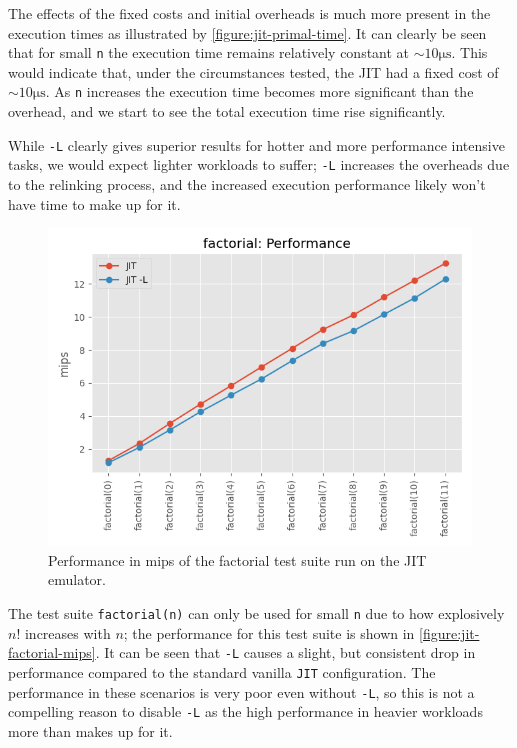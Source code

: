The effects of the fixed costs and initial overheads is much more present in the execution times as illustrated by \autoref{figure:jit-primal-time}. It can clearly be seen that for small \texttt{n} the execution time remains relatively constant at $\sim10\si{\micro\second}$. This would indicate that, under the circumstances tested, the JIT had a fixed cost of $\sim10\si{\micro\second}$. As \texttt{n} increases the execution time becomes more significant than the overhead, and we start to see the total execution time rise significantly.

While \texttt{-L} clearly gives superior results for hotter and more performance intensive tasks, we would expect lighter workloads to suffer; \texttt{-L} increases the overheads due to the relinking process, and the increased execution performance likely won't have time to make up for it.

\begin{figure}[H]
    \centering
    \includegraphics[scale=0.75]{output/graphs/tests/jit/factorial/mips.png}
    \caption{Performance in mips of the factorial test suite run on the JIT emulator.}
    \label{figure:jit-factorial-mips}
\end{figure}

The test suite \texttt{factorial(n)} can only be used for small \texttt{n} due to how explosively $n!$ increases with $n$; the performance for this test suite is shown in \autoref{figure:jit-factorial-mips}. It can be seen that \texttt{-L} causes a slight, but consistent drop in performance compared to the standard vanilla \texttt{JIT} configuration. The performance in these scenarios is very poor even without \texttt{-L}, so this is not a compelling reason to disable \texttt{-L} as the high performance in heavier workloads more than makes up for it.

